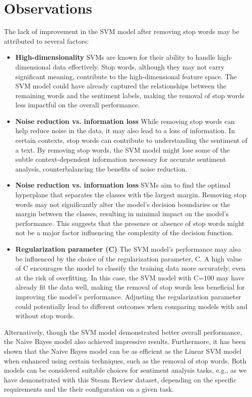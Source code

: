 \documentclass{article}
\begin{document}
\section{Observations}
The lack of improvement in the SVM model after removing stop words may be attributed to several factors:
\begin{itemize}
    \item \textbf{High-dimensionality} SVMs are known for their ability to handle high-dimensional data effectively. Stop words, although they may not carry significant meaning, contribute to the high-dimensional feature space. The SVM model could have already captured the relationships between the remaining words and the sentiment labels, making the removal of stop words less impactful on the overall performance.
    \item \textbf{Noise reduction vs. information loss} While removing stop words can help reduce noise in the data, it may also lead to a loss of information. In certain contexts, stop words can contribute to understanding the sentiment of a text. By removing stop words, the SVM model might lose some of the subtle context-dependent information necessary for accurate sentiment analysis, counterbalancing the benefits of noise reduction.
    \item \textbf{Noise reduction vs. information loss} SVMs aim to find the optimal hyperplane that separates the classes with the largest margin. Removing stop words may not significantly alter the model's decision boundaries or the margin between the classes, resulting in minimal impact on the model's performance. This suggests that the presence or absence of stop words might not be a major factor influencing the complexity of the decision function.
    \item \textbf{Regularization parameter (C)} The SVM model's performance may also be influenced by the choice of the regularization parameter, C. A high value of C encourages the model to classify the training data more accurately, even at the risk of overfitting. In this case, the SVM model with C=100 may have already fit the data well, making the removal of stop words less beneficial for improving the model's performance. Adjusting the regularization parameter could potentially lead to different outcomes when comparing models with and without stop words.
\end{itemize}
Alternatively, though the SVM model demonstrated better overall performance, the Naive Bayes model also achieved impressive results. Furthermore, it has been shown that the Naive Bayes model can be as efficient as the Linear SVM model when enhanced using certain techniques, such as the removal of stop words. Both models can be considered suitable choices for sentiment analysis tasks, e.g., as we have demonstrated with this Steam Review dataset, depending on the specific requirements and the their configuration on a given task.
\end{document}
